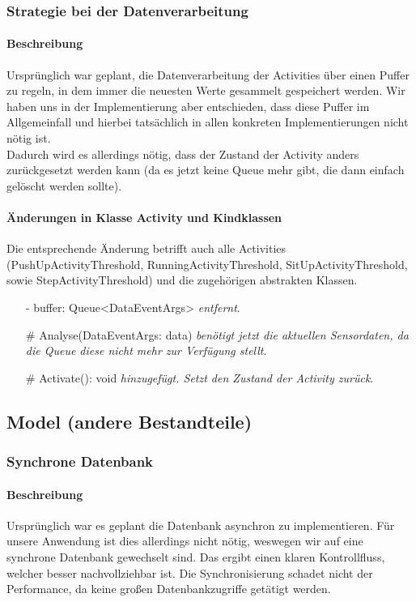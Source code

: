 \documentclass[a4paper,12pt]{article}
\begin{document}
\subsubsection{Strategie bei der Datenverarbeitung}
\paragraph{Beschreibung}
Ursprünglich war geplant, die Datenverarbeitung der Activities über einen Puffer zu regeln, in dem immer die neuesten Werte gesammelt gespeichert werden. Wir haben uns in der Implementierung aber entschieden, dass diese Puffer im Allgemeinfall und hierbei tatsächlich in allen konkreten Implementierungen nicht nötig ist.\\
Dadurch wird es allerdings nötig, dass der Zustand der Activity anders zurückgesetzt werden kann (da es jetzt keine Queue mehr gibt, die dann einfach gelöscht werden sollte).
\paragraph{Änderungen in Klasse Activity und Kindklassen}
Die entsprechende Änderung betrifft auch alle Activities (PushUpActivityThreshold, RunningActivityThreshold, SitUpActivityThreshold, sowie StepActivityThreshold) und die zugehörigen abstrakten Klassen.
\begin{itemize}
	\item [-] buffer: Queue<DataEventArgs> \textit{entfernt}.
	\item [\#] Analyse(DataEventArgs: data) \textit{benötigt jetzt die aktuellen Sensordaten, da die Queue diese nicht mehr zur Verfügung stellt}.
	\item [\#] Activate(): void \textit{hinzugefügt. Setzt den Zustand der Activity zurück}.
\end{itemize}
\subsection{Model (andere Bestandteile)}

\subsubsection{Synchrone Datenbank}
\paragraph{Beschreibung}
Ursprünglich war es geplant die Datenbank asynchron zu implementieren. Für unsere Anwendung ist dies allerdings nicht nötig, weswegen wir auf eine synchrone Datenbank gewechselt sind. Das ergibt einen klaren Kontrollfluss, welcher besser nachvollziehbar ist. Die Synchronisierung schadet nicht der Performance, da keine großen Datenbankzugriffe getätigt werden.
\end{document}
